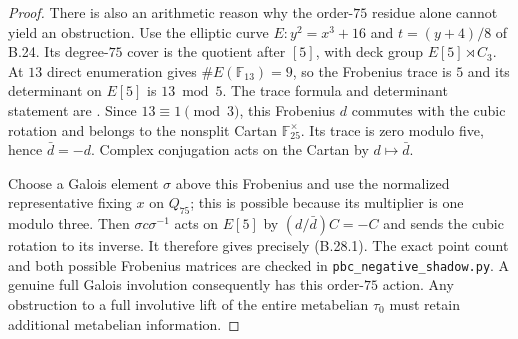 \begin{proof}
There is also an arithmetic reason why the order-$75$
residue alone cannot yield an obstruction. Use the elliptic
curve $E:y^2=x^3+16$ and $t=(y+4)/8$ of B.24.
Its degree-$75$ cover is the quotient after $[5]$, with
deck group $E[5]\rtimes C_3$. At $13$ direct enumeration
gives $\#E(\mathbb F_{13})=9$, so the Frobenius trace
is $5$ and its determinant on $E[5]$ is $13\bmod5$.
The trace formula and determinant statement are
\cite[V, Proposition 8.3 and the Weil-pairing discussion
after Conjecture 8.5]{PBC_MilneEC2021}.
Since $13\equiv1\pmod3$, this Frobenius $d$ commutes
with the cubic rotation and belongs to the nonsplit
Cartan $\mathbb F_{25}^{\times}$. Its trace is zero
modulo five, hence $\bar d=-d$. Complex conjugation
acts on the Cartan by $d\mapsto\bar d$.

Choose a Galois element $\sigma$ above this Frobenius and
use the normalized representative fixing $x$ on $Q_{75}$;
this is possible because its multiplier is one modulo
three. Then $\sigma c\sigma^{-1}$ acts on $E[5]$ by
$(d/\bar d)C=-C$ and sends the cubic rotation to its
inverse. It therefore gives precisely (B.28.1).
The exact point count and both possible Frobenius
matrices are checked in
\texttt{pbc\_negative\_shadow.py}. A genuine full Galois
involution consequently has this order-$75$ action.
Any obstruction to a full involutive lift of the entire
metabelian $\tau_0$ must retain additional metabelian
information.
\end{proof}

